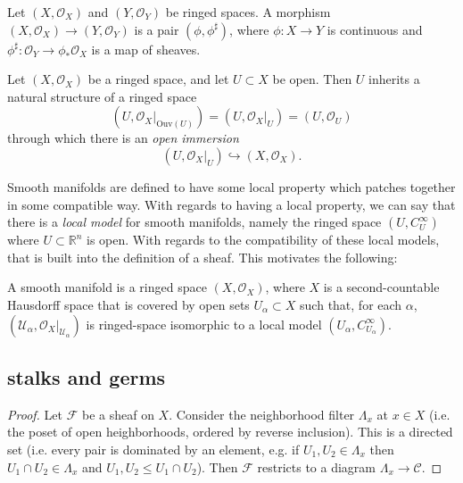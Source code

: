 \documentclass[12pt]{article}
\begin{document}
\begin{definition}
	Let $(X,\mathcal{O}_X)$ and $(Y,\mathcal{O}_Y)$ be ringed spaces. A morphism $(X,\mathcal{O}_X)\to(Y,\mathcal{O}_Y)$ is a pair $(\phi, \phi^\sharp)$, where $\phi:X\to Y$ is continuous and $\phi^\sharp:\mathcal{O}_Y\to\phi_\ast\mathcal{O}_X$ is a map of sheaves.
\end{definition}

\begin{definition}
	Let $(X,\mathcal{O}_X)$ be a ringed space, and let $U\subset X$ be open. Then $U$ inherits a natural structure of a ringed space 
	\begin{equation*}
		(U, \mathcal{O}_X|_{\text{Ouv}(U)}) = (U,\mathcal{O}_X|_U) = (U,\mathcal{O}_U)
	\end{equation*}
	through which there is an \emph{open immersion}
	\begin{equation*}
		(U,\mathcal{O}_X|_U) \hookrightarrow (X,\mathcal{O}_X).
	\end{equation*}
\end{definition}

\begin{example}
	Smooth manifolds are defined to have some local property which patches together in some compatible way. With regards to having a local property, we can say that there is a \textit{local model} for smooth manifolds, namely the ringed space $(U,C^\infty_U)$ where $U\subset\mathbb{R}^n$ is open. With regards to the compatibility of these local models, that is built into the definition of a sheaf. This motivates the following:

	\begin{definition}
		A smooth manifold is a ringed space $(X,\mathcal{O}_X)$, where $X$ is a second-countable Hausdorff space that is covered by open sets $U_\alpha\subset X$ such that, for each $\alpha$, $(\mathcal{U}_\alpha, \mathcal{O}_X|_{\mathcal{U}_\alpha})$ is ringed-space isomorphic to a local model $(U_\alpha, C^\infty_{U_\alpha})$.
	\end{definition}
\end{example}

\subsection{stalks and germs} %

\begin{proof}
	Let $\mathscr{F}$ be a sheaf on $X$. Consider the neighborhood filter $\Lambda_x$ at $x\in X$ (i.e. the poset of open heighborhoods, ordered by reverse inclusion). This is a directed set (i.e. every pair is dominated by an element, e.g. if $U_1,U_2\in\Lambda_x$ then $U_1\cap U_2\in\Lambda_x$ and $U_1,U_2\leq U_1\cap U_2$). Then $\mathscr{F}$ restricts to a diagram $\Lambda_x\to\mathcal{C}$.
\end{proof}
\end{document}
